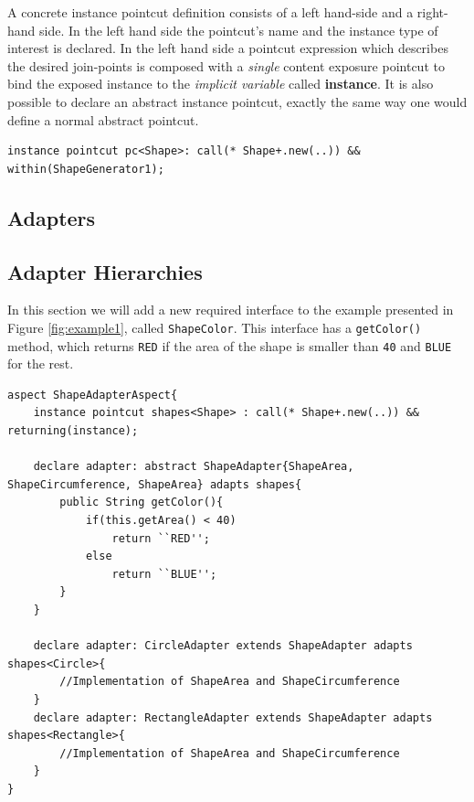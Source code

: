 \documentclass{llncs}
\begin{document}
A concrete instance pointcut definition consists of a left hand-side and a right-hand side. In the left hand side the pointcut's name and the instance type of interest is declared. In the left hand side a pointcut expression which describes the desired join-points is composed with a \emph{single} content exposure pointcut to bind the exposed instance to the \emph{implicit variable} called \textbf{instance}. It is also possible to declare an abstract instance pointcut, exactly the same way one would define a normal abstract pointcut. 

\vspace{-15}
\begin{lstlisting}[float=h!]
instance pointcut pc<Shape>: call(* Shape+.new(..)) && within(ShapeGenerator1);
\end{lstlisting}



\subsection{Adapters}

\subsection{Adapter Hierarchies}
In this section we will add a new required interface to the example presented in Figure \ref{fig:example1}, called \texttt{ShapeColor}. This interface has a \texttt{getColor()} method, which returns \texttt{RED} if the area of the shape is smaller than \texttt{40} and \texttt{BLUE} for the rest. 

\begin{lstlisting}[float=tb, caption={An Adapter Hierarchy}, label={lst:adaphier}]
aspect ShapeAdapterAspect{
	instance pointcut shapes<Shape> : call(* Shape+.new(..)) && returning(instance);
	
	declare adapter: abstract ShapeAdapter{ShapeArea, ShapeCircumference, ShapeArea} adapts shapes{
		public String getColor(){
			if(this.getArea() < 40)
				return ``RED'';
			else
				return ``BLUE'';
		}
	}

	declare adapter: CircleAdapter extends ShapeAdapter adapts shapes<Circle>{
		//Implementation of ShapeArea and ShapeCircumference
	}
	declare adapter: RectangleAdapter extends ShapeAdapter adapts shapes<Rectangle>{
		//Implementation of ShapeArea and ShapeCircumference
	}
}
\end{lstlisting}
\end{document}
